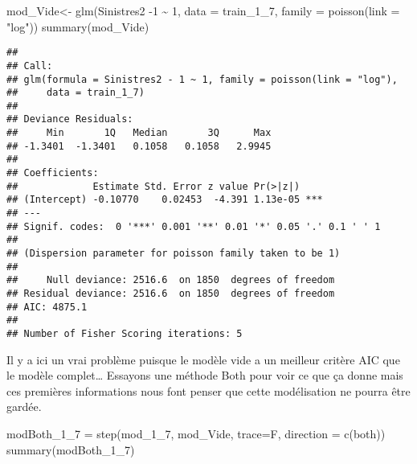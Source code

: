 \documentclass[
]{article}
\newenvironment{Shaded}{\begin{snugshade}}{\end{snugshade}}
\newcommand{\AttributeTok}[1]{\textcolor[rgb]{0.77,0.63,0.00}{#1}}
\newcommand{\DecValTok}[1]{\textcolor[rgb]{0.00,0.00,0.81}{#1}}
\newcommand{\FunctionTok}[1]{\textcolor[rgb]{0.00,0.00,0.00}{#1}}
\newcommand{\NormalTok}[1]{#1}
\newcommand{\OtherTok}[1]{\textcolor[rgb]{0.56,0.35,0.01}{#1}}
\newcommand{\SpecialCharTok}[1]{\textcolor[rgb]{0.00,0.00,0.00}{#1}}
\newcommand{\StringTok}[1]{\textcolor[rgb]{0.31,0.60,0.02}{#1}}
\begin{document}
\begin{Shaded}
\begin{Highlighting}[]
\NormalTok{mod\_Vide}\OtherTok{\textless{}{-}} \FunctionTok{glm}\NormalTok{(Sinistres2 }\SpecialCharTok{{-}}\DecValTok{1} \SpecialCharTok{\textasciitilde{}} \DecValTok{1}\NormalTok{, }\AttributeTok{data =}\NormalTok{ train\_1\_7, }\AttributeTok{family =} \FunctionTok{poisson}\NormalTok{(}\AttributeTok{link =} \StringTok{"log"}\NormalTok{))}
\FunctionTok{summary}\NormalTok{(mod\_Vide)}
\end{Highlighting}
\end{Shaded}

\begin{verbatim}
## 
## Call:
## glm(formula = Sinistres2 - 1 ~ 1, family = poisson(link = "log"), 
##     data = train_1_7)
## 
## Deviance Residuals: 
##     Min       1Q   Median       3Q      Max  
## -1.3401  -1.3401   0.1058   0.1058   2.9945  
## 
## Coefficients:
##             Estimate Std. Error z value Pr(>|z|)    
## (Intercept) -0.10770    0.02453  -4.391 1.13e-05 ***
## ---
## Signif. codes:  0 '***' 0.001 '**' 0.01 '*' 0.05 '.' 0.1 ' ' 1
## 
## (Dispersion parameter for poisson family taken to be 1)
## 
##     Null deviance: 2516.6  on 1850  degrees of freedom
## Residual deviance: 2516.6  on 1850  degrees of freedom
## AIC: 4875.1
## 
## Number of Fisher Scoring iterations: 5
\end{verbatim}

Il y a ici un vrai problème puisque le modèle vide a un meilleur critère
AIC que le modèle complet\ldots{} Essayons une méthode Both pour voir ce
que ça donne mais ces premières informations nous font penser que cette
modélisation ne pourra être gardée.

\begin{Shaded}
\begin{Highlighting}[]
\NormalTok{modBoth\_1\_7 }\OtherTok{=} \FunctionTok{step}\NormalTok{(mod\_1\_7, mod\_Vide, }\AttributeTok{trace=}\NormalTok{F, }\AttributeTok{direction =} \FunctionTok{c}\NormalTok{(}\StringTok{\textquotesingle{}both\textquotesingle{}}\NormalTok{))}
\FunctionTok{summary}\NormalTok{(modBoth\_1\_7)}
\end{Highlighting}
\end{Shaded}
\end{document}
